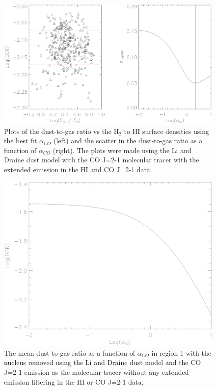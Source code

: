 \begin{figure}
   \centering
   \includegraphics[width=1.\textwidth]{dgr_imgs/region_1-3_aco_output_21_no_filt.eps}
   \caption[Unfiltered Dust-to-Gas Ratio Determination Plots for CO J=2-1]{Plots of the dust-to-gas ratio vs the H$_2$ to HI surface densities using the best fit $\alpha_{CO}$ (left) and the scatter in the dust-to-gas ratio as a function of $\alpha_{CO}$ (right).  The plots were made using the Li and Draine dust model with the CO J=2-1 molecular tracer with the extended emission in the HI and CO J=2-1 data.}
   \label{fig:filt_dgr}
\end{figure}
 
 \begin{figure}
   \centering
   \includegraphics[width=1.\textwidth]{dgr_imgs/region_1-3_aco_dgr_nf.eps}
   \caption[Mean Dust-to-Gas Ratio vs $\alpha_{CO}$ Without Extended Emission Filtering]{The mean dust-to-gas ratio as a function of $\alpha_{CO}$ in region 1 with the nucleus removed using the Li and Draine dust model and the CO J=2-1 emission as the molecular tracer without any extended emission filtering in the HI or CO J=2-1 data.} 
    \label{fig:filt_aco_dgr}
\end{figure}
 
